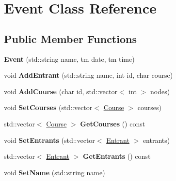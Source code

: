 \hypertarget{classEvent}{\section{\-Event \-Class \-Reference}
\label{classEvent}
}
\subsection*{\-Public \-Member \-Functions}
\begin{DoxyCompactItemize}
\item 
\hypertarget{classEvent_a8f1894bd5c65c832e95b42bd4565e631}{{\bfseries \-Event} (std\-::string name, tm date, tm time)}\label{classEvent_a8f1894bd5c65c832e95b42bd4565e631}

\item 
\hypertarget{classEvent_af38a15ffed314b5251a124f45ea41575}{void {\bfseries \-Add\-Entrant} (std\-::string name, int id, char course)}\label{classEvent_af38a15ffed314b5251a124f45ea41575}

\item 
\hypertarget{classEvent_a1a1fba26c0066499be299b3d3ff938b5}{void {\bfseries \-Add\-Course} (char id, std\-::vector$<$ int $>$ nodes)}\label{classEvent_a1a1fba26c0066499be299b3d3ff938b5}

\item 
\hypertarget{classEvent_a894b95d4d8b4844798ec95fa5ef8141a}{void {\bfseries \-Set\-Courses} (std\-::vector$<$ \hyperlink{classCourse}{\-Course} $>$ courses)}\label{classEvent_a894b95d4d8b4844798ec95fa5ef8141a}

\item 
\hypertarget{classEvent_a7fc2ac39ff5fc682762451b277c73d68}{std\-::vector$<$ \hyperlink{classCourse}{\-Course} $>$ {\bfseries \-Get\-Courses} () const }\label{classEvent_a7fc2ac39ff5fc682762451b277c73d68}

\item 
\hypertarget{classEvent_a11e2729e7676c2950dfc7cb56dbbea94}{void {\bfseries \-Set\-Entrants} (std\-::vector$<$ \hyperlink{classEntrant}{\-Entrant} $>$ entrants)}\label{classEvent_a11e2729e7676c2950dfc7cb56dbbea94}

\item 
\hypertarget{classEvent_ab0232dfcc1b986cb2a79fef05b2d7efc}{std\-::vector$<$ \hyperlink{classEntrant}{\-Entrant} $>$ {\bfseries \-Get\-Entrants} () const }\label{classEvent_ab0232dfcc1b986cb2a79fef05b2d7efc}

\item 
\hypertarget{classEvent_a2c91dbd3d7a2a3c31895d9f16a55f70e}{void {\bfseries \-Set\-Name} (std\-::string name)}\label{classEvent_a2c91dbd3d7a2a3c31895d9f16a55f70e}


\end{DoxyCompactItemize}
